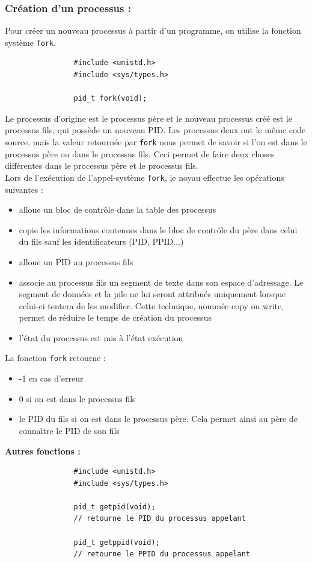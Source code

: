		\subsubsection{Création d'un processus :}
			Pour créer un nouveau processus à partir d'un programme, on utilise la fonction système \lstinline!fork!. 
			\begin{lstlisting}
				#include <unistd.h>
				#include <sys/types.h>

				pid_t fork(void);
			\end{lstlisting}
			Le processus d'origine est le processus père et le nouveau processus créé est le processus fils, qui possède un nouveau PID. Les processus deux ont le même code source, mais la valeur retournée par \lstinline!fork! nous permet de savoir si l'on est dans le processus père ou dans le processus fils. Ceci permet de faire deux choses différentes dans le processus père et le processus fils.\\
			Lors de l'exécution de l'appel-système \lstinline!fork!, le noyau effectue les opérations suivantes :
			\begin{itemize}
				\item alloue un bloc de contrôle dans la table des processus
				\item copie les informations contenues dans le bloc de contrôle du père dans celui du fils sauf les identificateurs (PID, PPID...)
				\item alloue un PID au processus fils
				\item associe au processus fils un segment de texte dans son espace d'adressage. Le segment de données et la pile ne lui seront attribués uniquement lorsque celui-ci tentera de les modifier. Cette technique, nommée copy on write, permet de réduire le temps de création du processus
				\item l'état du processus est mis à l'état exécution
			\end{itemize}
			
			\noindent La fonction \lstinline!fork! retourne :
			\begin{itemize}
				\item -1 en cas d'erreur
				\item 0 si on est dans le processus fils
				\item le PID du fils si on est dans le processus père. Cela permet ainsi au père de connaître le PID de son fils
			\end{itemize}
			
			\noindent \textbf{Autres fonctions :}
			\begin{lstlisting}
				#include <unistd.h>
				#include <sys/types.h>

				pid_t getpid(void);
				// retourne le PID du processus appelant
				
				pid_t getppid(void);
				// retourne le PPID du processus appelant
			\end{lstlisting}
			
